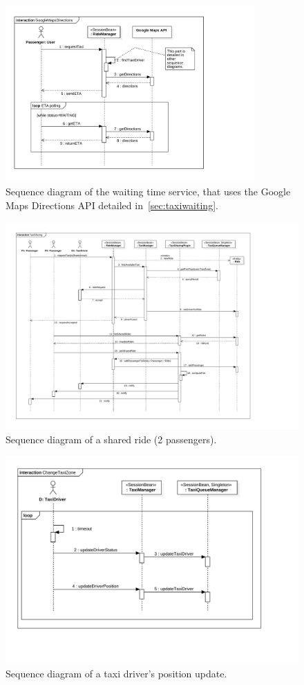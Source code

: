 \begin{figure}[h]
    \centering
    \includegraphics[width=0.85\textwidth]{diagrams/sequence_gmaps}
    \caption{Sequence diagram of the waiting time service, that uses the Google Maps Directions API detailed in~\autoref{sec:taxiwaiting}.}
    \label{fig:sequence-gmaps}
\end{figure}

\begin{figure}[h]
    \centering
    \includegraphics[width=\textwidth]{diagrams/sequence_taxisharing}
    \caption{Sequence diagram of a shared ride (2 passengers).}
    \label{fig:sequence-sharing}
\end{figure}

\begin{figure}[h]
    \centering
    \includegraphics[width=\textwidth]{diagrams/sequence_taxi_change_zone}
    \caption{Sequence diagram of a taxi driver's position update.}
    \label{fig:sequence-changezone}
\end{figure}

\FloatBarrier
